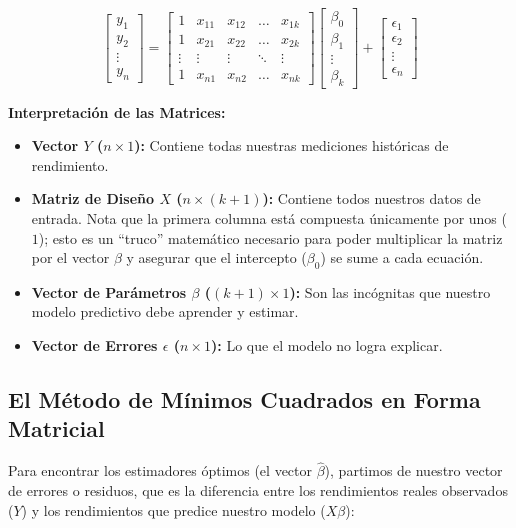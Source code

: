 \documentclass{article}
\begin{document}
$$
\begin{bmatrix}
y_1 \\
y_2 \\
\vdots \\
y_n
\end{bmatrix}
=
\begin{bmatrix}
1 & x_{11} & x_{12} & \dots & x_{1k} \\
1 & x_{21} & x_{22} & \dots & x_{2k} \\
\vdots & \vdots & \vdots & \ddots & \vdots \\
1 & x_{n1} & x_{n2} & \dots & x_{nk}
\end{bmatrix}
\begin{bmatrix}
\beta_0 \\
\beta_1 \\
\vdots \\
\beta_k
\end{bmatrix}
+
\begin{bmatrix}
\epsilon_1 \\
\epsilon_2 \\
\vdots \\
\epsilon_n
\end{bmatrix}
$$

\textbf{Interpretación de las Matrices:}
\begin{itemize}
    \item \textbf{Vector $Y$ ($n \times 1$):} Contiene todas nuestras mediciones históricas de rendimiento.
    \item \textbf{Matriz de Diseño $X$ ($n \times (k+1)$):} Contiene todos nuestros datos de entrada. Nota que la primera columna está compuesta únicamente por unos ($1$); esto es un ``truco'' matemático necesario para poder multiplicar la matriz por el vector $\beta$ y asegurar que el intercepto ($\beta_0$) se sume a cada ecuación.
    \item \textbf{Vector de Parámetros $\beta$ ($(k+1) \times 1$):} Son las incógnitas que nuestro modelo predictivo debe aprender y estimar.
    \item \textbf{Vector de Errores $\epsilon$ ($n \times 1$):} Lo que el modelo no logra explicar.
\end{itemize}
\subsection{El Método de Mínimos Cuadrados en Forma Matricial}

Para encontrar los estimadores óptimos (el vector $\hat{\beta}$), partimos de nuestro vector de errores o residuos, que es la diferencia entre los rendimientos reales observados ($Y$) y los rendimientos que predice nuestro modelo ($X\beta$):
\end{document}
